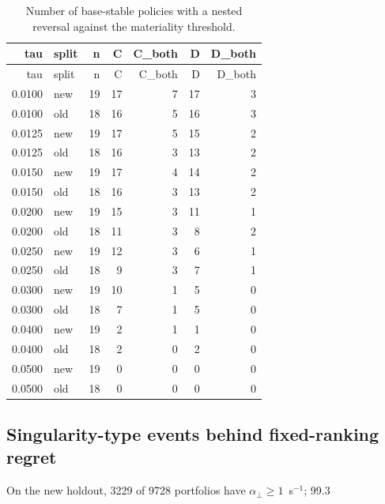 \documentclass[10pt,a4paper]{article}
\newcommand{\aperp}{\alpha_{\perp}}
\begin{document}
{\scriptsize
\begin{longtable}{rlrrrrr}
\caption{Number of base-stable policies with a nested reversal against the materiality threshold.}\label{tab:s-tau}\\
\toprule
tau & split & n & C & C\_both & D & D\_both \\
\midrule
\endfirsthead
\toprule
tau & split & n & C & C\_both & D & D\_both \\
\midrule
\endhead
0.0100 & new & 19 & 17 & 7 & 17 & 3 \\
0.0100 & old & 18 & 16 & 5 & 16 & 3 \\
0.0125 & new & 19 & 17 & 5 & 15 & 2 \\
0.0125 & old & 18 & 16 & 3 & 13 & 2 \\
0.0150 & new & 19 & 17 & 4 & 14 & 2 \\
0.0150 & old & 18 & 16 & 3 & 13 & 2 \\
0.0200 & new & 19 & 15 & 3 & 11 & 1 \\
0.0200 & old & 18 & 11 & 3 & 8 & 2 \\
0.0250 & new & 19 & 12 & 3 & 6 & 1 \\
0.0250 & old & 18 & 9 & 3 & 7 & 1 \\
0.0300 & new & 19 & 10 & 1 & 5 & 0 \\
0.0300 & old & 18 & 7 & 1 & 5 & 0 \\
0.0400 & new & 19 & 2 & 1 & 1 & 0 \\
0.0400 & old & 18 & 2 & 0 & 2 & 0 \\
0.0500 & new & 19 & 0 & 0 & 0 & 0 \\
0.0500 & old & 18 & 0 & 0 & 0 & 0 \\
\bottomrule
\end{longtable}}

\subsection{Singularity-type events behind fixed-ranking regret}
On the new holdout, 3229 of 9728 portfolios have $\aperp\ge1$~s$^{-1}$; 99.3%
\end{document}
